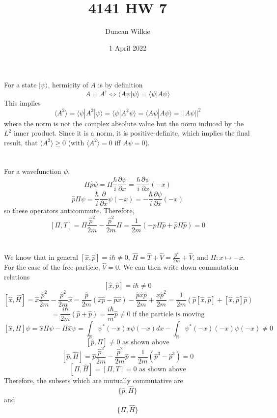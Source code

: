 \documentclass{article}
\title{4141 HW 7}
\author{Duncan Wilkie}
\date{1 April 2022}
\begin{document}
\maketitle

\section{}
For a state $|\psi\rangle$, hermicity of $A$ is by definition
\[A=A^{\dagger}\Leftrightarrow\langle A\psi | \psi\rangle={\langle \psi | A\psi \rangle}\]
This implies
\[\langle A^{2} \rangle=\langle \psi| A^{2}|\psi \rangle=\langle \psi | A^{2}\psi \rangle=\langle A\psi | A\psi \rangle=||A\psi||^{2}\]
where the norm is not the complex absolute value but the norm induced by the $L^{2}$ inner product. Since it is a norm, it is positive-definite, which implies the final result, that $\langle A^{2} \rangle \geq 0$ (with $\langle A^{2} \rangle=0$ iff $A\psi=0$).

\section{}
For a wavefunction $\psi$,
\[\Pi \hat{p}\psi = \Pi\frac{\hbar}{i}\frac{\partial \psi}{\partial x}=\frac{\hbar}{i}\frac{\partial\psi}{\partial x}(-x)\]
\[\hat{p}\Pi\psi=\frac{\hbar}{i}\frac{\partial }{\partial x}\psi(-x)=-\frac{\hbar}{i}\frac{\partial \psi}{\partial x}(-x)\]
so these operators anticommute.
Therefore,
\[[\Pi,T]=\Pi\frac{\hat{p}^{2}}{2m}-\frac{\hat{p}^{2}}{2m}\Pi=\frac{1}{2m}\left( -\hat{p}\Pi\hat{p} + \hat{p}\Pi\hat{p}\right)=0\]

\section{}
We know that in general $[\hat{x},\hat{p}]=i\hbar\neq 0$, $\hat{H}=\hat{T}+\hat{V}=\frac{\hat{p}^{2}}{2m}+\hat{V}$, and $\Pi: x\mapsto -x$. For the case of the free particle, $\hat{V}=0$. We can then write down commutation relations
\[[\hat{x},\hat{p}]=i\hbar\neq 0\]
\[[\hat{x},\hat{H}]=\hat{x}\frac{\hat{p}^{2}}{2m}-\frac{\hat{p}^{2}}{2m}\hat{x}=\frac{\hat{p}}{2m}\left( \hat{x}\hat{p}-\hat{p}\hat{x} \right)-\frac{\hat{p}\hat{x}\hat{p}}{2m}+\frac{x\hat{p}^{2}}{2m}=\frac{1}{2m}\left( \hat{p}[\hat{x},\hat{p}] + [\hat{x},\hat{p}]\hat{p} \right)\]
\[=\frac{i\hbar}{2m}\left( \hat{p}+\hat{p} \right)=\frac{i\hbar}{m}\hat{p}\neq 0 \textrm{ if the particle is moving}\]
\[[\hat{x},\Pi]\psi=\hat{x}\Pi\psi-\Pi\hat{x}\psi=\int_{\mathbb{R}}\psi^{*}(-x)x\psi(-x)dx-\int_{\mathbb{R}}\psi^{*}(-x)(-x)\psi(-x)\neq 0\]
\[[\hat{p},\Pi]\neq 0 \textrm{ as shown above}\]
\[[\hat{p}, \hat{H}]=\hat{p}\frac{\hat{p}^{2}}{2m}-\frac{\hat{p}^{2}}{2m}\hat{p}=\frac{1}{2m}\left( \hat{p}^{3}-\hat{p}^{3} \right)=0\]
\[[\Pi,\hat{H}]=[\Pi,T]=0 \textrm{ as shown above}\]
Therefore, the subsets which are mutually commutative are
\[\{\hat{p},\hat{H}\}\]
and
\[\{\Pi,\hat{H}\}\]

\section{}
\end{document}
